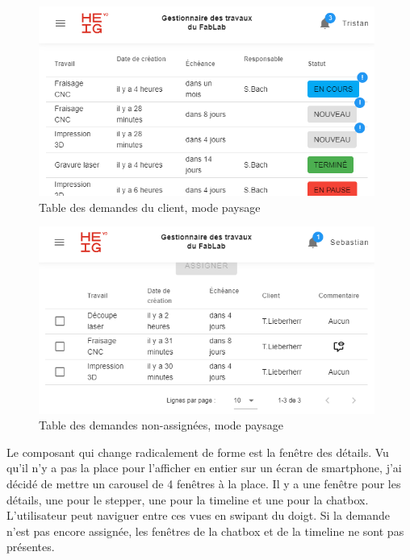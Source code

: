 \documentclass[
    iai, %
    eai, %
]{heig-tb}
\begin{document}
\begin{figure}[h]
  \centering
  \includegraphics[width=11cm]{ui_mobile_myjobs_client_landscape.PNG}
  \caption{Table des demandes du client, mode paysage}
\end{figure}

\begin{figure}[h]
  \centering
  \includegraphics[width=11cm]{ui_mobile_alljobs_landscape.PNG}
  \caption{Table des demandes non-assignées, mode paysage}
\end{figure}

Le composant qui change radicalement de forme est la fenêtre des détails. Vu qu'il n'y a pas la place pour l'afficher en entier sur un écran de smartphone, j'ai décidé de mettre un carousel de 4 fenêtres à la place. Il y a une fenêtre pour les détails, une pour le stepper, une pour la timeline et une pour la chatbox. L'utilisateur peut naviguer entre ces vues en swipant du doigt.
Si la demande n'est pas encore assignée, les fenêtres de la chatbox et de la timeline ne sont pas présentes.

\newpage
\end{document}
